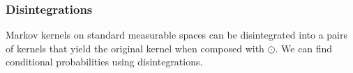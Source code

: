 





\subsubsection{Disintegrations}

Markov kernels on standard measurable spaces can be disintegrated into a pairs of kernels that yield the original kernel when composed with $\odot$. We can find conditional probabilities using disintegrations.

